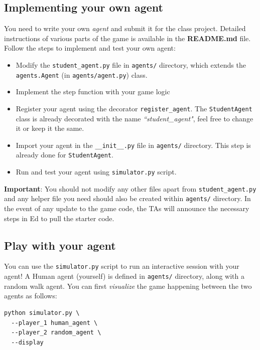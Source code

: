 \documentclass[twoside,11pt]{article}
\begin{document}
\subsection{Implementing your own agent}

You need to write your own \textit{agent} and submit it for the class project. Detailed instructions of various parts of the game is available in the \textbf{README.md} file. Follow the steps to implement and test your own agent:

\begin{itemize}
    \item Modify the 
    \texttt{student\_agent.py} file in \texttt{agents/} directory, which extends the \texttt{agents.Agent} (in \texttt{agents/agent.py}) class.
    \item Implement the step function with your game logic
    \item Register your agent using the decorator \texttt{register\_agent}. The \texttt{StudentAgent} class is already decorated with the name \textit{``student\_agent"}, feel free to change it or keep it the same.
    \item Import your agent in the \texttt{\_\_init\_\_.py} file in \texttt{agents/} directory. This step is already done for \texttt{StudentAgent}.
    \item Run and test your agent using \texttt{simulator.py} script.
\end{itemize}

\noindent \textbf{Important}: You should not modify any other files apart from \texttt{student\_agent.py} and any helper file you need should also be created within \texttt{agents/} directory. In the event of any update to the game code, the TAs will announce the necessary steps in Ed to pull the starter code.

\subsection{Play with your agent}

You can use the \texttt{simulator.py} script to run an interactive session with your agent! A Human agent (yourself) is defined in \texttt{agents/} directory, along with a random walk agent. You can first \textit{visualize} the game happening between the two agents as follows:

\begin{verbatim}
python simulator.py \
  --player_1 human_agent \
  --player_2 random_agent \
  --display
\end{verbatim}
\end{document}

